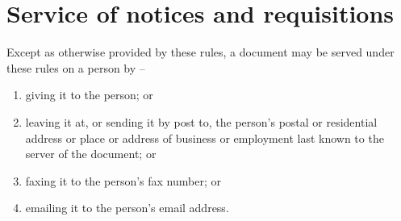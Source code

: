 \section{Service of notices and requisitions}
\label{rule:notices}

Except as otherwise provided by these rules, a document may be served under these rules on a person by --
\begin{enumerate}
	\item giving it to the person; or
	\item leaving it at, or sending it by post to, the person's postal or residential address or place or address of business or employment last known to the server of the document; or
	\item faxing it to the person's fax number; or
	\item emailing it to the person's email address.
\end{enumerate}
